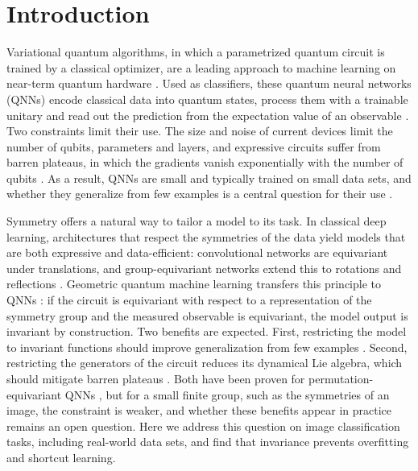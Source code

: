 \documentclass[aps,pra,reprint,superscriptaddress,longbibliography]{revtex4-2}
\begin{document}
\maketitle

\section{Introduction}\label{sec:intro}

Variational quantum algorithms, in which a parametrized quantum circuit is trained by a classical optimizer, are a leading approach to machine learning on near-term quantum hardware \cite{preskill2018quantum, cerezo2021variational, schuld2021machine}. Used as classifiers, these quantum neural networks (QNNs) encode classical data into quantum states, process them with a trainable unitary and read out the prediction from the expectation value of an observable \cite{schuld2021machine, havlicek2019supervised, schuld2021effect, larose2020robust}. Two constraints limit their use. The size and noise of current devices limit the number of qubits, parameters and layers, and expressive circuits suffer from barren plateaus, in which the gradients vanish exponentially with the number of qubits \cite{mcclean2018barren, ragone2024lie, fontana2024characterizing, larocca2025barren, wang2021noise}. As a result, QNNs are small and typically trained on small data sets, and whether they generalize from few examples is a central question for their use \cite{caro2022generalization, banchi2021generalization, abbas2021power, gilfuster2024understanding, bowles2024better}.

Symmetry offers a natural way to tailor a model to its task. In classical deep learning, architectures that respect the symmetries of the data yield models that are both expressive and data-efficient: convolutional networks are equivariant under translations, and group-equivariant networks extend this to rotations and reflections \cite{cohen2016group, bronstein2021geometric}. Geometric quantum machine learning transfers this principle to QNNs \cite{cong2019quantum, larocca2022group, meyer2023exploiting, skolik2023equivariant, zheng2023speeding, sauvage2024building, schatzki2024theoretical, ragone2022representation, nguyen2024theory}: if the circuit is equivariant with respect to a representation of the symmetry group and the measured observable is equivariant, the model output is invariant by construction. Two benefits are expected. First, restricting the model to invariant functions should improve generalization from few examples \cite{kubler2021inductive, elesedy2021provably}. Second, restricting the generators of the circuit reduces its dynamical Lie algebra, which should mitigate barren plateaus \cite{larocca2022group, ragone2024lie, sauvage2024building, west2024provably}. Both have been proven for permutation-equivariant QNNs \cite{schatzki2024theoretical}, but for a small finite group, such as the symmetries of an image, the constraint is weaker, and whether these benefits appear in practice remains an open question. Here we address this question on image classification tasks, including real-world data sets, and find that invariance prevents overfitting and shortcut learning.
\end{document}
